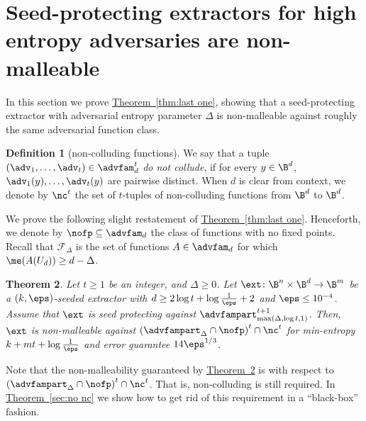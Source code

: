 \documentclass[11pt]{article}
\numberwithin{equation}{section}
\newtheorem{theorem}{Theorem}[section]
\theoremstyle{definition}
\newtheorem{definition}[theorem]{Definition}
\theoremstyle{plain}
\newcommand{\expref}[2]{\hyperref[#2]{#1~\ref{#2}}}
\begin{document}
%
\section{Seed-protecting  %
extractors for high entropy adversaries are non-malleable}\label{sec:the delta proof}

In this section we prove \expref{Theorem}{thm:last one}, showing that a seed-protecting extractor with adversarial entropy parameter $\Delta$
is non-malleable against roughly the same adversarial function class.



\begin{definition}[non-colluding functions]
	We say that a tuple $(\adv_1,\ldots,\adv_t) \in \advfam_d^t$ 
	\emph{do not collude}, if for every $y \in \B^d$, $\adv_1(y),\ldots,\adv_{t}(y)$ are pairwise distinct. 
	When $d$ is clear from context, we denote by $\nc^t$ the set of $t$-tuples of non-colluding
	functions from $\B^d$ to $\B^d$. %
\end{definition}



We prove the following slight restatement of \expref{Theorem}{thm:last one}. Henceforth, we denote by
$\nofp \subseteq \advfam_d$ the class of functions with no fixed points. Recall that $\mathcal{F}_{\Delta}$ is the set of functions $A \in \advfam_d$ for which $\me(A(U_d)) \ge d-\Delta$.

\begin{theorem}\label{t: sp to nm}
Let $t \ge 1$ be an integer, and $\Delta \ge 0$.
Let $\ext\colon\B^{n}\times\B^{d}\rightarrow\B^m$ be a $(k,\eps)$-seeded extractor with $d \ge 2\log{t} + \log\frac1{\eps} + 2$ and $\eps \leq 10^{-4}$. Assume that $\ext$ is seed protecting against $\advfampart^{t+1}_{\max(\Delta, \log t,1)}$. Then, $\ext$ is non-malleable against $\left(\advfampart_{\Delta} \cap \nofp\right)^t \cap \nc^t$  for min-entropy $k+mt+\log\frac1{\eps}$ and error guarantee $14 \eps^{1/3}$.
\end{theorem}

Note that the non-malleability guaranteed by \expref{Theorem}{t: sp to nm} is with respect to $\left(\advfampart_{\Delta} \cap \nofp\right)^t \cap \nc^t$. That is, non-colluding is still required. In \expref{Theorem}{sec:no nc} we show how to get rid of this requirement in a ``black-box'' fashion.
\end{document}
